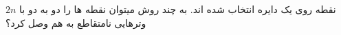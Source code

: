 \exercise
$2n$
 نقطه روی يک دايره انتخاب شده اند. به چند روش میتوان نقطه ها را دو به دو با وترهايی نامتقاطع به هم وصل كرد؟